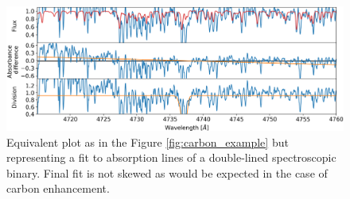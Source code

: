 \begin{figure}
	\centering
	\includegraphics[width=\textwidth]{bad_fit2_150603001801056.png}
	\caption{Equivalent plot as in the Figure \ref{fig:carbon_example} but representing a fit to absorption lines of a double-lined spectroscopic binary. Final fit is not skewed as would be expected in the case of carbon enhancement.}
	\label{fig:bad_fit2}
\end{figure}




